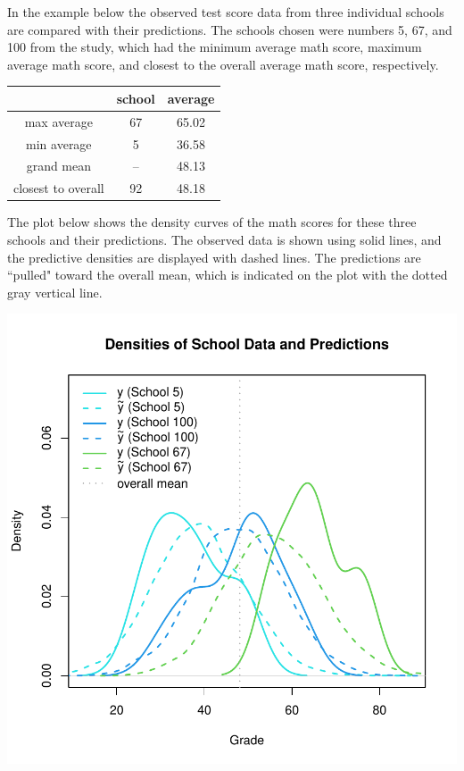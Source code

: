 \documentclass[12pt, a4paper]{article}
\begin{document}
\noindent In the example below the observed test score data from three individual schools are compared with their predictions.  The schools chosen were numbers 5, 67, and 100 from the study, which had the minimum average math score, maximum average math score, and closest to the overall average math score, respectively.


\begin{center}
  \begin{tabular}{|c|c|c|}
    \hline
    & school & average \\
    \hline
    max average & 67 & 65.02 \\
    \hline
    min average & 5 & 36.58 \\
    \hline
    grand mean & -- & 48.13 \\
    \hline
    closest to overall & 92 & 48.18\\
    \hline
  \end{tabular}
\end{center}

\noindent The plot below shows the density curves of the math scores for these three schools and their predictions.  The observed data is shown using solid lines, and the predictive densities are displayed with dashed lines.  The predictions are ``pulled" toward the overall mean, which is indicated on the plot with the dotted gray vertical line.

\includegraphics{Thesis_v3-010}
\end{document}

